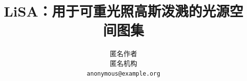 \documentclass[10pt,twocolumn,letterpaper]{article}
\title{LiSA：用于可重光照高斯泼溅的光源空间图集}
\author{匿名作者\\
匿名机构\\
{\tt\small anonymous@example.org}
}
\begin{document}
\maketitle








{
    \small
    
    
}

\end{document}
